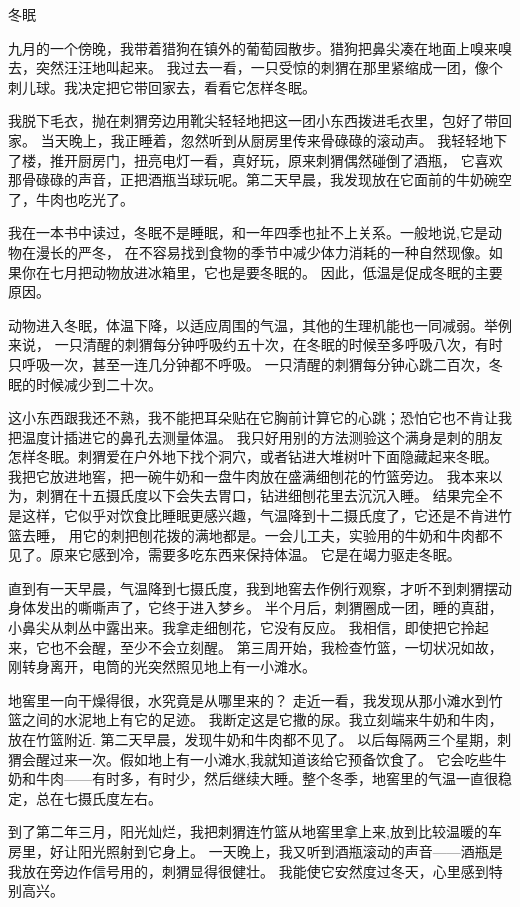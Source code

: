 \documentclass[12pt,UTF8]{ctexbook}
\begin{document}
冬眠

九月的一个傍晚，我带着猎狗在镇外的葡萄园散步。猎狗把鼻尖凑在地面上嗅来嗅去，突然汪汪地叫起来。
我过去一看，一只受惊的刺猬在那里紧缩成一团，像个刺儿球。我决定把它带回家去，看看它怎样冬眠。

我脱下毛衣，抛在刺猬旁边用靴尖轻轻地把这一团小东西拨进毛衣里，包好了带回家。
当天晚上，我正睡着，忽然听到从厨房里传来骨碌碌的滚动声。
我轻轻地下了楼，推开厨房门，扭亮电灯一看，真好玩，原来刺猬偶然碰倒了酒瓶，
它喜欢那骨碌碌的声音，正把酒瓶当球玩呢。第二天早晨，我发现放在它面前的牛奶碗空了，牛肉也吃光了。

我在一本书中读过，冬眠不是睡眠，和一年四季也扯不上关系。一般地说,它是动物在漫长的严冬，
在不容易找到食物的季节中减少体力消耗的一种自然现像。如果你在七月把动物放进冰箱里，它也是要冬眠的。
因此，低温是促成冬眠的主要原因。

动物进入冬眠，体温下降，以适应周围的气温，其他的生理机能也一同减弱。举例来说，
一只清醒的刺猬每分钟呼吸约五十次，在冬眠的时候至多呼吸八次，有时只呼吸一次，甚至一连几分钟都不呼吸。
一只清醒的刺猬每分钟心跳二百次，冬眠的时候减少到二十次。

这小东西跟我还不熟，我不能把耳朵贴在它胸前计算它的心跳；恐怕它也不肯让我把温度计插进它的鼻孔去测量体温。
我只好用别的方法测验这个满身是刺的朋友怎样冬眠。刺猬爱在户外地下找个洞穴，或者钻进大堆树叶下面隐藏起来冬眠。
我把它放进地窖，把一碗牛奶和一盘牛肉放在盛满细刨花的竹篮旁边。
我本来以为，刺猬在十五摄氏度以下会失去胃口，钻进细刨花里去沉沉入睡。
结果完全不是这样，它似乎对饮食比睡眠更感兴趣，气温降到十二摄氏度了，它还是不肯进竹篮去睡，
用它的刺把刨花拨的满地都是。一会儿工夫，实验用的牛奶和牛肉都不见了。原来它感到冷，需要多吃东西来保持体温。
它是在竭力驱走冬眠。

直到有一天早晨，气温降到七摄氏度，我到地窖去作例行观察，才听不到刺猬摆动身体发出的嘶嘶声了，它终于进入梦乡。
半个月后，刺猬圈成一团，睡的真甜，小鼻尖从刺丛中露出来。我拿走细刨花，它没有反应。
我相信，即使把它拎起来，它也不会醒，至少不会立刻醒。
第三周开始，我检查竹篮，一切状况如故，刚转身离开，电筒的光突然照见地上有一小滩水。

地窖里一向干燥得很，水究竟是从哪里来的？ 走近一看，我发现从那小滩水到竹篮之间的水泥地上有它的足迹。
我断定这是它撒的尿。我立刻端来牛奶和牛肉，放在竹篮附近. 第二天早晨，发现牛奶和牛肉都不见了。
以后每隔两三个星期，刺猬会醒过来一次。假如地上有一小滩水,我就知道该给它预备饮食了。
它会吃些牛奶和牛肉——有时多，有时少，然后继续大睡。整个冬季，地窖里的气温一直很稳定，总在七摄氏度左右。

到了第二年三月，阳光灿烂，我把刺猬连竹篮从地窖里拿上来,放到比较温暖的车房里，好让阳光照射到它身上。
一天晚上，我又听到酒瓶滚动的声音——酒瓶是我放在旁边作信号用的，刺猬显得很健壮。
我能使它安然度过冬天，心里感到特别高兴。
\end{document}
